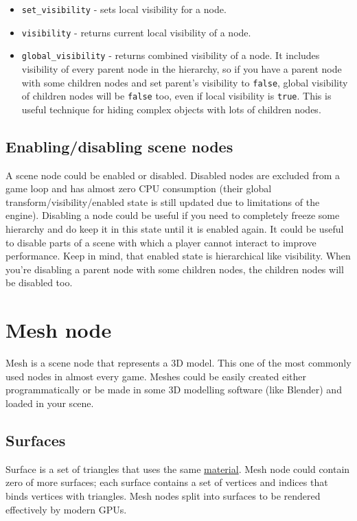 \documentclass[
]{book}
\providecommand{\tightlist}{%
  \setlength{\itemsep}{0pt}\setlength{\parskip}{0pt}}
\theoremstyle{definition}
\theoremstyle{definition}
\theoremstyle{definition}
\theoremstyle{definition}
\theoremstyle{remark}
\begin{document}
\begin{itemize}
\tightlist
\item
  \texttt{set\_visibility} - sets local visibility for a node.
\item
  \texttt{visibility} - returns current local visibility of a node.
\item
  \texttt{global\_visibility} - returns combined visibility of a node. It includes visibility of every parent node in the hierarchy, so if you have a parent node with some children nodes and set parent's visibility to \texttt{false}, global visibility of children nodes will be \texttt{false} too, even if local visibility is \texttt{true}. This is useful technique for hiding complex objects with lots of children nodes.
\end{itemize}

\subsection{Enabling/disabling scene nodes}\label{enablingdisabling-scene-nodes}

A scene node could be enabled or disabled. Disabled nodes are excluded from a game loop and has almost zero CPU consumption (their global transform/visibility/enabled state is still updated due to limitations of the engine). Disabling a node could be useful if you need to completely freeze some hierarchy and do keep it in this state until it is enabled again. It could be useful to disable parts of a scene with which a player cannot interact to improve performance. Keep in mind, that enabled state is hierarchical like visibility. When you're disabling a parent node with some children nodes, the children nodes will be disabled too.

\section{Mesh node}\label{mesh-node}

Mesh is a scene node that represents a 3D model. This one of the most commonly used nodes in almost every game. Meshes could be easily created either programmatically or be made in some 3D modelling software (like Blender) and loaded in your scene.

\subsection{Surfaces}\label{surfaces}

Surface is a set of triangles that uses the same \href{../rendering/materials.md}{material}. Mesh node could contain zero of more surfaces; each surface contains a set of vertices and indices that binds vertices with triangles. Mesh nodes split into surfaces to be rendered effectively by modern GPUs.
\end{document}
